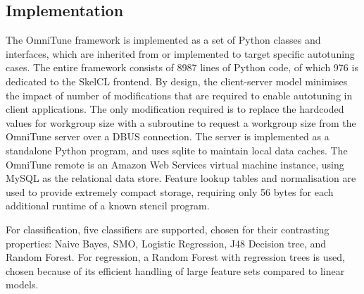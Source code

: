 \documentclass[nonatbib,preprint,10pt]{sigplanconf}
\begin{document}
\subsection{Implementation}

The OmniTune framework is implemented as a set of Python classes and
interfaces, which are inherited from or implemented to target specific
autotuning cases. The entire framework consists of 8987 lines of
Python code, of which 976 is dedicated to the SkelCL frontend. By
design, the client-server model minimises the impact of number of
modifications that are required to enable autotuning in client
applications. The only modification required is to replace the
hardcoded values for workgroup size with a subroutine to request a
workgroup size from the OmniTune server over a DBUS connection. The
server is implemented as a standalone Python program, and uses sqlite
to maintain local data caches. The OmniTune remote is an Amazon Web
Services virtual machine instance, using MySQL as the relational data
store. Feature lookup tables and normalisation are used to provide
extremely compact storage, requiring only 56 bytes for each additional
runtime of a known stencil program.

For classification, five classifiers are supported, chosen for their
contrasting properties: Naive Bayes, SMO, Logistic Regression, J48
Decision tree, and Random Forest. For regression, a Random Forest with
regression trees is used, chosen because of its efficient handling of
large feature sets compared to linear models.





\end{document}
